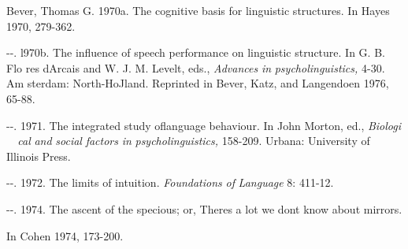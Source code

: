 \begin{styleStandard}
Bever, Thomas G. 1970a. The cognitive basis for linguistic structures. In Hayes 1970, 279-362.
\end{styleStandard}


\begin{listWWNumxiileveli}
\item 
\begin{styleStandard}
{}-{}-. l970b. The influence of speech performance on linguistic structure. In G. B. Flo\- res d{\textquotesingle}Arcais and W. J. M. Levelt, eds., \textit{Advances}\textit{ }\textit{in}\textit{ }\textit{psycholinguistics,}\textit{ }4-30. Am\- sterdam: North-HoJland. Reprinted in Bever, Katz, and Langendoen 1976, 65-88.
\end{styleStandard}


\item 
\begin{styleStandard}
{}-{}-. 1971. The integrated study oflanguage behaviour. In John Morton, ed., \textit{Biologi\-}\textit{ \ \ }\textit{cal}\textit{ }\textit{and}\textit{ }\textit{social}\textit{ }\textit{factors}\textit{ }\textit{in}\textit{ }\textit{psycholinguistics,}\textit{ }158-209. Urbana: University of Illinois Press.
\end{styleStandard}


\item 
\begin{styleStandard}
{}-{}-. 1972. The limits of intuition. \textit{Foundations}\textit{ }\textit{of}\textit{ }\textit{Language}\textit{ }8: 411-12.
\end{styleStandard}


\item 
\begin{styleStandard}
{}-{}-. 1974. The ascent of the specious; or, There{\textquotesingle}s a lot we don{\textquotesingle}t know about mirrors.
\end{styleStandard}


\end{listWWNumxiileveli}
\begin{styleStandard}
In Cohen 1974, 173-200.
\end{styleStandard}


